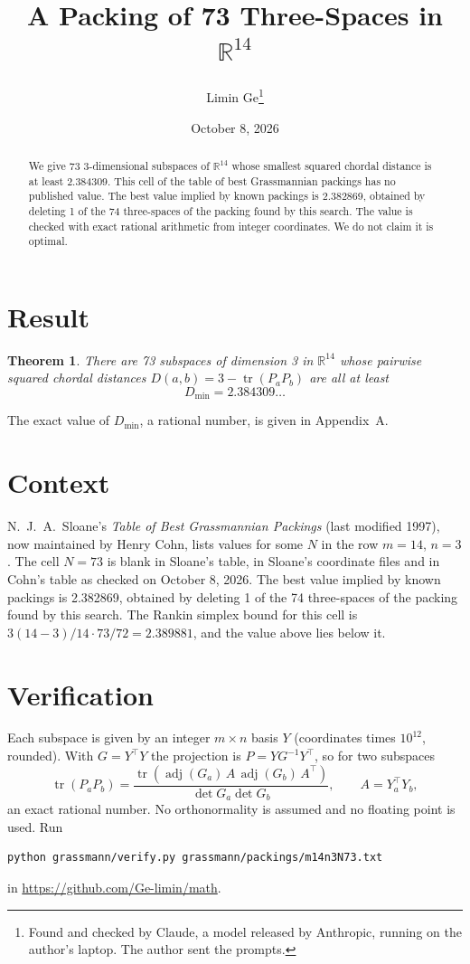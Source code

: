 \documentclass[11pt,a4paper]{article}
\title{A Packing of 73 Three-Spaces in $\mathbb{R}^{14}$}
\author{Limin Ge\thanks{Found and checked by Claude, a model released by Anthropic, running on the author's laptop. The author sent the prompts.}}
\date{October 8, 2026}
\newtheorem*{theorem}{Theorem}
\begin{document}
\maketitle
\begin{abstract}
We give 73 3-dimensional subspaces of $\mathbb{R}^{14}$ whose smallest squared chordal distance is at least 2.384309. This cell of the table of best Grassmannian packings has no published value. The best value implied by known packings is 2.382869, obtained by deleting 1 of the 74 three-spaces of the packing found by this search. The value is checked with exact rational arithmetic from integer coordinates. We do not claim it is optimal.
\end{abstract}

\section{Result}
\begin{theorem}
There are 73 subspaces of dimension 3 in $\mathbb{R}^{14}$ whose pairwise squared chordal distances $D(a,b) = 3 - \operatorname{tr}(P_aP_b)$ are all at least
\[ D_{\min} = 2.384309\ldots \]
\end{theorem}
The exact value of $D_{\min}$, a rational number, is given in Appendix~A.


\section{Context}
N.~J.~A.~Sloane's \emph{Table of Best Grassmannian Packings} (last modified 1997), now maintained by Henry Cohn, lists values for some $N$ in the row $m=14$, $n=3$. The cell $N=73$ is blank in Sloane's table, in Sloane's coordinate files and in Cohn's table as checked on October 8, 2026. The best value implied by known packings is 2.382869, obtained by deleting 1 of the 74 three-spaces of the packing found by this search. The Rankin simplex bound for this cell is $3(14-3)/14\cdot 73/72 = 2.389881$, and the value above lies below it.


\section{Verification}
Each subspace is given by an integer $m\times n$ basis $Y$ (coordinates times $10^{12}$, rounded). With $G=Y^\top Y$ the projection is $P=YG^{-1}Y^\top$, so for two subspaces
\[ \operatorname{tr}(P_aP_b)=\frac{\operatorname{tr}(\operatorname{adj}(G_a)\,A\,\operatorname{adj}(G_b)\,A^\top)}{\det G_a\det G_b},\qquad A=Y_a^\top Y_b, \]
an exact rational number. No orthonormality is assumed and no floating point is used. Run
\begin{verbatim}
python grassmann/verify.py grassmann/packings/m14n3N73.txt
\end{verbatim}
in \url{https://github.com/Ge-limin/math}.
\end{document}
